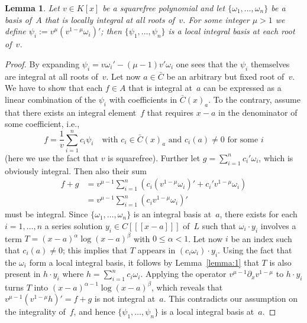 \documentclass[final,1p,times,authoryear]{elsarticle}
\newtheorem{lemma}[theorem]{Lemma}
\begin{document}
\begin{lemma}\label{lemma:ibv}
Let $v\in K[x]$ be a squarefree polynomial and let $\{\omega_1,\ldots,\omega_n\}$
be a basis of~$A$ that is locally integral at all roots of~$v$.
For some integer $\mu>1$ we define $\psi_i:=v^\mu\left(v^{1-\mu}\omega_i\right)'$; then
$\{\psi_1,\ldots,\psi_n\}$ is a local integral basis at each root of~$v$.
\end{lemma}
\begin{proof}
By expanding $\psi_i=v\omega_i'-(\mu-1)v'\omega_i$ one sees that the $\psi_i$
themselves are integral at all roots of~$v$. Let now $a\in\bar{C}$ be an
arbitrary but fixed root of~$v$. We have to show that each $f\in A$ that is
integral at~$a$ can be expressed as a linear combination of the $\psi_i$ with
coefficients in $\bar C(x)_a$. To the contrary, assume that there exists an
integral element~$f$ that requires $x-a$ in the denominator of some
coefficient, i.e.,
\[
  f = \frac{1}{v} \sum_{i=1}^n c_i \psi_i \quad\text{with }c_i\in \bar{C}(x)_a
  \text{ and } c_i(a)\neq0 \text{ for some } i
\]
(here we use the fact that $v$ is squarefree).  Further let $g=\sum_{i=1}^n
c_i'\omega_i$, which is obviously integral. Then also their sum
\begin{align*}
  f+g &= v^{\mu-1} \sum_{i=1}^n \left(c_i\left(v^{1-\mu}\omega_i\right)'
  + c_i'v^{1-\mu}\omega_i \right) \\
  &= v^{\mu-1} \sum_{i=1}^n \left(c_iv^{1-\mu}\omega_i\right)'
\end{align*}
must be integral. Since $\{\omega_1,\ldots,\omega_n\}$ is an integral basis at~$a$,
there exists for each $i=1,\ldots,n$ a series solution $y_i\in C[[[x-a]]]$
of~$L$ such that $\omega_i\cdot y_i$ involves a term
$T=(x-a)^\alpha\log(x-a)^\beta$ with $0\leq\alpha<1$.
Let now $i$ be an index such that $c_i(a)\neq0$;
this implies that $T$ appears in $(c_i\omega_i)\cdot y_i$.
Using the fact that the $\omega_i$ form a local integral basis, it follows by
Lemma~\ref{lemma:1} that $T$ is also present in $h\cdot y_i$ where
$h=\sum_{i=1}^n c_i\omega_i$. Applying the operator $v^{\mu-1}\partial_xv^{1-\mu}$
to $h\cdot y_i$ turns $T$ into $(x-a)^{\alpha-1}\log(x-a)^\beta$, which reveals that
$v^{\mu-1}(v^{1-\mu}h)'=f+g$ is not integral at~$a$. This contradicts our assumption on
the integrality of~$f$, and hence $\{\psi_1,\ldots,\psi_n\}$ is a local integral
basis at~$a$.
\end{proof}
\end{document}
